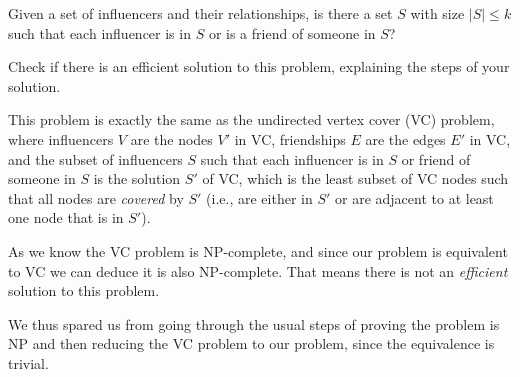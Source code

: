 \documentclass{cal}
\begin{document}
{Given a set of influencers and their relationships, is there a set $S$ with size $|S| \leq k$ such that each influencer is in $S$ or is a friend of someone in $S$?

Check if there is an efficient solution to this problem, explaining the steps of your solution.

\ansseparator

This problem is exactly the same as the undirected vertex cover (VC) problem, where influencers $V$ are the nodes $V'$ in VC, friendships $E$ are the edges $E'$ in VC, and the subset of influencers $S$ such that each influencer is in $S$ or friend of someone in $S$ is the solution $S'$ of VC, which is the least subset of VC nodes such that all nodes are \emph{covered} by $S'$ (i.e., are either in $S'$ or are adjacent to at least one node that is in $S'$).

As we know the VC problem is NP-complete, and since our problem is equivalent to VC we can deduce it is also NP-complete. That means there is not an \emph{efficient} solution to this problem.

We thus spared us from going through the usual steps of proving the problem is NP and then reducing the VC problem to our problem, since the equivalence is trivial.

}
\end{document}
